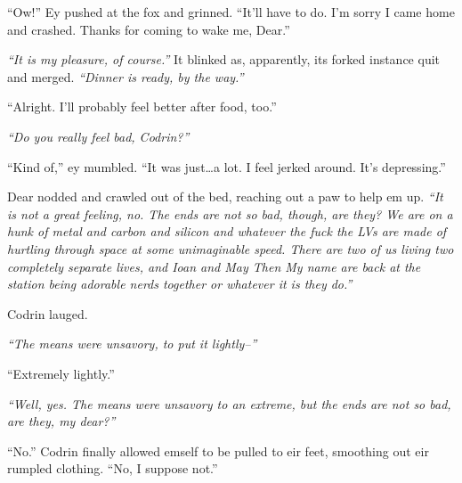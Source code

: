 ``Ow!'' Ey pushed at the fox and grinned. ``It'll have to do. I'm sorry I came home and crashed. Thanks for coming to wake me, Dear.''

\emph{``It is my pleasure, of course.''} It blinked as, apparently, its forked instance quit and merged. \emph{``Dinner is ready, by the way.''}

``Alright. I'll probably feel better after food, too.''

\emph{``Do you really feel bad, Codrin?''}

``Kind of,'' ey mumbled. ``It was just\ldots a lot. I feel jerked around. It's depressing.''

Dear nodded and crawled out of the bed, reaching out a paw to help em up. \emph{``It is not a great feeling, no. The ends are not so bad, though, are they? We are on a hunk of metal and carbon and silicon and whatever the fuck the LVs are made of hurtling through space at some unimaginable speed. There are two of us living two completely separate lives, and Ioan and May Then My name are back at the station being adorable nerds together or whatever it is they do.''}

Codrin lauged.

\emph{``The means were unsavory, to put it lightly--''}

``Extremely lightly.''

\emph{``Well, yes. The means were unsavory to an extreme, but the ends are not so bad, are they, my dear?''}

``No.'' Codrin finally allowed emself to be pulled to eir feet, smoothing out eir rumpled clothing. ``No, I suppose not.''
